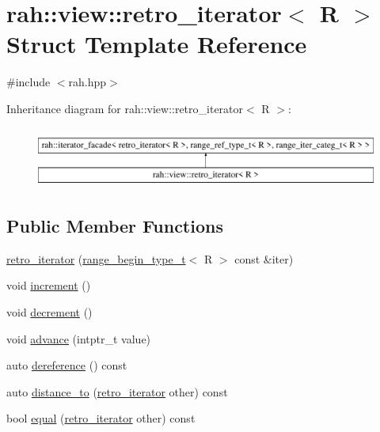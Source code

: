 \hypertarget{structrah_1_1view_1_1retro__iterator}{}\section{rah\+::view\+::retro\+\_\+iterator$<$ R $>$ Struct Template Reference}
\label{structrah_1_1view_1_1retro__iterator}


{\ttfamily \#include $<$rah.\+hpp$>$}

Inheritance diagram for rah\+::view\+::retro\+\_\+iterator$<$ R $>$\+:\begin{figure}[H]
\begin{center}
\leavevmode
\includegraphics[height=2.000000cm]{structrah_1_1view_1_1retro__iterator}
\end{center}
\end{figure}
\subsection*{Public Member Functions}
\begin{DoxyCompactItemize}
\item 
\mbox{\hyperlink{structrah_1_1view_1_1retro__iterator_ad7369163c4bbabf1e8699fd5ec8f96c8}{retro\+\_\+iterator}} (\mbox{\hyperlink{namespacerah_afa7f59d1f37c7b9d9caed37551be9eaa}{range\+\_\+begin\+\_\+type\+\_\+t}}$<$ R $>$ const \&iter)
\item 
void \mbox{\hyperlink{structrah_1_1view_1_1retro__iterator_a22d7931c285c8d3b3e1e91146783bba9}{increment}} ()
\item 
void \mbox{\hyperlink{structrah_1_1view_1_1retro__iterator_a8da10018776a90937b78433b85a73330}{decrement}} ()
\item 
void \mbox{\hyperlink{structrah_1_1view_1_1retro__iterator_a5f70f5e51fe8e6c47cbeac7c8fa2a9d2}{advance}} (intptr\+\_\+t value)
\item 
auto \mbox{\hyperlink{structrah_1_1view_1_1retro__iterator_a056244974e69e84f1a31ab82e115ba46}{dereference}} () const
\item 
auto \mbox{\hyperlink{structrah_1_1view_1_1retro__iterator_a35d2fd256c7fe08dffeba98014627952}{distance\+\_\+to}} (\mbox{\hyperlink{structrah_1_1view_1_1retro__iterator}{retro\+\_\+iterator}} other) const
\item 
bool \mbox{\hyperlink{structrah_1_1view_1_1retro__iterator_ad06ccb4d1bbf30f343a168ae8f4d6dde}{equal}} (\mbox{\hyperlink{structrah_1_1view_1_1retro__iterator}{retro\+\_\+iterator}} other) const
\end{DoxyCompactItemize}
